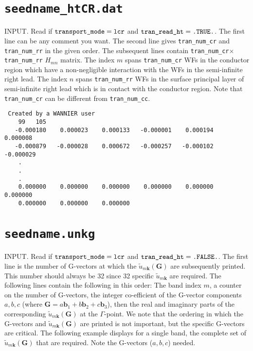 \section{{\tt seedname\_htCR.dat}}

INPUT.
Read if $\verb#transport_mode#=\verb#lcr#$
and $\verb#tran_read_ht#=\verb#.TRUE.#$.
The first line can be any comment you want.
The second line gives
\verb#tran_num_cr#
and \verb#tran_num_rr#
in the given order.
The subsequent lines contain 
\verb#tran_num_cr#$\times$\verb#tran_num_rr#
$H_{mn}$ matrix.
The index $m$ spans \verb#tran_num_cr# WFs
in the conductor region which
have a non-negligible interaction with
the WFs in the semi-infinite right lead.
The index $n$ spans \verb#tran_num_rr# WFs
in the surface principal layer of semi-infinite right lead
which is in contact with the conductor region.
Note that \verb#tran_num_cr# 
can be different from \verb#tran_num_cc#.

\begin{verbatim}
 Created by a WANNIER user
    99   105
   -0.000180    0.000023    0.000133   -0.000001    0.000194    0.000008
   -0.000879   -0.000028    0.000672   -0.000257   -0.000102   -0.000029
    .
    .
    .
    0.000000    0.000000    0.000000    0.000000    0.000000    0.000000
    0.000000    0.000000    0.000000
\end{verbatim}

\section{{\tt seedname.unkg}}
\label{sec:files_unkg}

INPUT.
Read if $\verb#transport_mode#=\verb#lcr#$
and $\verb#tran_read_ht#=\verb#.FALSE.#$.
The first line is the number of G-vectors at which the
$\tilde{u}_{m\mathbf{k}}(\mathbf{G})$ are subsequently
printed. This number should always be 32 since 32 
specific $\tilde{u}_{m\mathbf{k}}$ are required.
The following lines contain the following in this order:
The band index $m$, a counter on the number of G-vectors,
the integer co-efficient of the G-vector components $a,b,c$
(where $\mathbf{G}=a\mathbf{b}_1+b\mathbf{b}_2+c\mathbf{b}_3$),
then the real and imaginary parts of the corresponding
$\tilde{u}_{m\mathbf{k}}(\mathbf{G})$ at the $\Gamma$-point. 
We note that the ordering in which the G-vectors and 
$\tilde{u}_{m\mathbf{k}}(\mathbf{G})$ are printed is not 
important, but the specific G-vectors are critical. The following 
example displays for a single band, the complete set of 
$\tilde{u}_{m\mathbf{k}}(\mathbf{G})$ that are required.
Note the G-vectors ($a,b,c$) needed.
 
